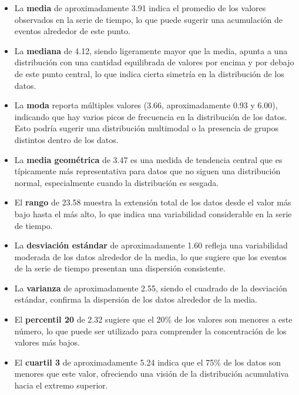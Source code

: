 \documentclass[11pt]{article} %
\begin{document}
	\begin{itemize}
		\item La \textbf{media} de aproximadamente 3.91 indica el promedio de los valores observados en la serie de tiempo, lo que puede sugerir una acumulación de eventos alrededor de este punto.
		
		\item La \textbf{mediana} de 4.12, siendo ligeramente mayor que la media, apunta a una distribución con una cantidad equilibrada de valores por encima y por debajo de este punto central, lo que indica cierta simetría en la distribución de los datos.
		
		\item La \textbf{moda} reporta múltiples valores (3.66, aproximadamente 0.93 y 6.00), indicando que hay varios picos de frecuencia en la distribución de los datos. Esto podría sugerir una distribución multimodal o la presencia de grupos distintos dentro de los datos.
		
		\item La \textbf{media geométrica} de 3.47 es una medida de tendencia central que es típicamente más representativa para datos que no siguen una distribución normal, especialmente cuando la distribución es sesgada.
		
		\item El \textbf{rango} de 23.58 muestra la extensión total de los datos desde el valor más bajo hasta el más alto, lo que indica una variabilidad considerable en la serie de tiempo.
		
		\item La \textbf{desviación estándar} de aproximadamente 1.60 refleja una variabilidad moderada de los datos alrededor de la media, lo que sugiere que los eventos de la serie de tiempo presentan una dispersión consistente.
		
		\item La \textbf{varianza} de aproximadamente 2.55, siendo el cuadrado de la desviación estándar, confirma la dispersión de los datos alrededor de la media.
		
		\item El \textbf{percentil 20} de 2.32 sugiere que el 20\% de los valores son menores a este número, lo que puede ser utilizado para comprender la concentración de los valores más bajos.
		
		\item El \textbf{cuartil 3} de aproximadamente 5.24 indica que el 75\% de los datos son menores que este valor, ofreciendo una visión de la distribución acumulativa hacia el extremo superior.
		

\end{itemize}
\end{document}
